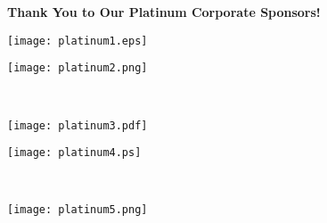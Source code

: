 \documentclass[twoside]{article}
\begin{document}
    \newpage
    { \fontsize{16}{19}\selectfont \bf Thank You to Our Platinum Corporate Sponsors!}
    \vspace{-.75em}\begin{center}
    \begin{minipage}{0.45\textwidth}\begin{center}\vfill\begin{adjustbox}{max size={!}{0.116666666667\textheight}}\texttt{[image: platinum1.eps]}\end{adjustbox}\vfill\end{center}\end{minipage}
        \hspace{2em}\begin{minipage}{0.45\textwidth}\begin{center}\vfill\begin{adjustbox}{max size={!}{0.116666666667\textheight}}\texttt{[image: platinum2.png]}\end{adjustbox}\vfill\end{center}\end{minipage}
        \\
            \begin{minipage}{0.45\textwidth}\begin{center}\vfill\begin{adjustbox}{max size={!}{0.116666666667\textheight}}\texttt{[image: platinum3.pdf]}\end{adjustbox}\vfill\end{center}\end{minipage}
        \hspace{2em}\begin{minipage}{0.45\textwidth}\begin{center}\vfill\begin{adjustbox}{max size={!}{0.116666666667\textheight}}\texttt{[image: platinum4.ps]}\end{adjustbox}\vfill\end{center}\end{minipage}
        \\
            \begin{minipage}{0.45\textwidth}\begin{center}\vfill\begin{adjustbox}{max size={!}{0.116666666667\textheight}}\texttt{[image: platinum5.png]}\end{adjustbox}\vfill\end{center}\end{minipage}

\end{center}
\end{document}
